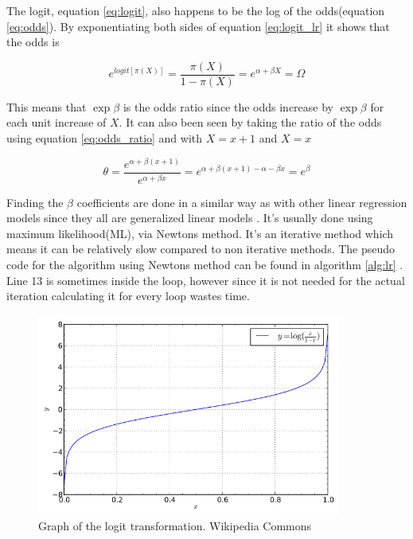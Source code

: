 \documentclass[10pt,a4paper]{report}
\begin{document}
The logit, equation \ref{eq:logit}, also happens to be the log of the odds(equation \ref{eq:odds})\cite{agresti_categorical}. By exponentiating both sides of equation \ref{eq:logit_lr} it shows that the odds is \cite{agresti_categorical}

\begin{equation}
e^{logit[\pi(X)]}=\frac{\pi(X)}{1-\pi(X)}=e^{\alpha+\beta X}=\Omega
\end{equation}

This means that $\exp{\beta}$ is the odds ratio since the odds increase by $\exp{\beta}$ for each unit increase of $X$\cite{agresti_categorical}. It can also been seen by taking the ratio of the odds using equation \ref{eq:odds_ratio} and  with $X=x+1$ and $X=x$

\begin{equation}
\theta=\frac{e^{\alpha+\beta (x+1)}}{e^{\alpha+\beta x}}=e^{\alpha+\beta (x+1)-\alpha-\beta x}=e^{\beta}
\end{equation}

Finding the $\beta$ coefficients are done in a similar way as with other linear regression models since they all are generalized linear models \cite{agresti_categorical}. It's usually done using  maximum likelihood(ML), via Newtons method\cite{agresti_categorical, uvehag_master_thesis}. It's an iterative method which means it can be relatively slow compared to non iterative methods. The pseudo code for the algorithm using Newtons method can be found in algorithm \ref{alg:lr} \cite{uvehag_master_thesis}. Line 13 is sometimes inside the loop, however since it is not needed for the actual iteration calculating it for every loop wastes time.

\begin{figure}[h]
    \centering
    \includegraphics[width=10cm]{logit.png}
    \caption{Graph of the logit transformation. Wikipedia Commons}
    \label{fig:logit}
\end{figure}
\end{document}
